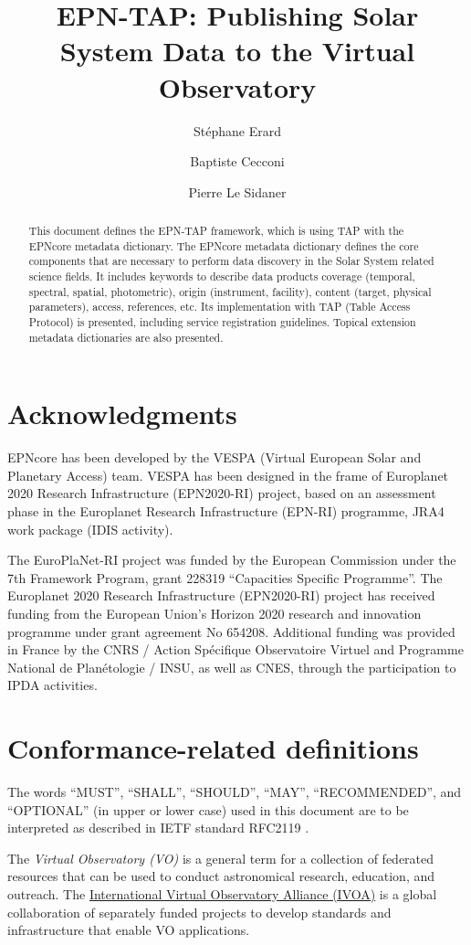 \documentclass[11pt,a4paper]{ivoa}
\title{EPN-TAP: Publishing Solar System Data to the Virtual Observatory}
\author{St\'ephane Erard}
\author{Baptiste Cecconi}
\author{Pierre Le Sidaner}
\begin{document}
\begin{abstract}
This document defines the EPN-TAP framework, which is using TAP with the EPNcore metadata dictionary. The EPNcore metadata dictionary defines the core components that are necessary 
to perform data discovery in the Solar System related science fields. It includes keywords to describe data products coverage (temporal, spectral, 
spatial, photometric), origin (instrument, facility), content (target, physical parameters), access, references, etc. Its implementation with TAP (Table Access Protocol) is presented, including service registration guidelines. Topical extension metadata dictionaries are also presented.
\end{abstract}


\section*{Acknowledgments}

EPNcore has been developed by the VESPA (Virtual European Solar and Planetary Access) team. 
VESPA has been designed in the frame of Europlanet 2020 Research Infrastructure (EPN2020-RI) project, based on an assessment phase in the Europlanet Research Infrastructure (EPN-RI) programme, JRA4 work package (IDIS activity).

The EuroPlaNet-RI project was funded by the European Commission under the 7th Framework Program, grant 228319 ``Capacities Specific Programme''.
The Europlanet 2020 Research Infrastructure (EPN2020-RI) project has received funding from the European Union's Horizon 2020 research and innovation programme under grant agreement No 654208. 
Additional funding was provided in France by the CNRS / Action Sp\'ecifique Observatoire Virtuel and Programme National de Plan\'etologie / INSU, as well as CNES, through the participation to IPDA activities.

\section*{Conformance-related definitions}

The words ``MUST'', ``SHALL'', ``SHOULD'', ``MAY'', ``RECOMMENDED'', and
``OPTIONAL'' (in upper or lower case) used in this document are to be
interpreted as described in IETF standard RFC2119 \citep{std:RFC2119}.

The \emph{Virtual Observatory (VO)} is a
general term for a collection of federated resources that can be used
to conduct astronomical research, education, and outreach.
The \href{http://www.ivoa.net}{International
Virtual Observatory Alliance (IVOA)} is a global
collaboration of separately funded projects to develop standards and
infrastructure that enable VO applications.
\end{document}
